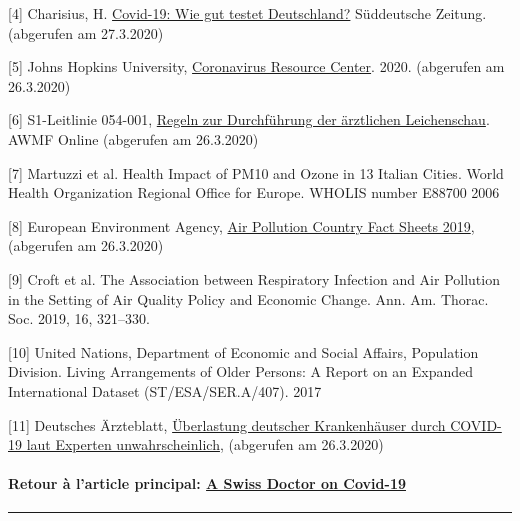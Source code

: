 {[}4{]} Charisius, H.
\href{https://www.sueddeutsche.de/gesundheit/covid-19-coronavirus-testverfahren-1.4855487}{Covid-19:
Wie gut testet Deutschland?} Süddeutsche Zeitung. (abgerufen am
27.3.2020)

{[}5{]} Johns Hopkins University,
\href{https://coronavirus.jhu.edu/map.html}{Coronavirus Resource
Center}. 2020. (abgerufen am 26.3.2020)

{[}6{]} S1-Leitlinie 054-001,
\href{https://www.awmf.org/uploads/tx_szleitlinien/054-002l_S1_Regeln-zur-Durchfuehrung-der-aerztlichen-Leichenschau_2018-02_01.pdf}{Regeln
zur Durchführung der ärztlichen Leichenschau}. AWMF Online (abgerufen am
26.3.2020)

{[}7{]} Martuzzi et al. Health Impact of PM10 and Ozone in 13 Italian
Cities. World Health Organization Regional Office for Europe. WHOLIS
number E88700 2006

{[}8{]} European Environment Agency,
\href{https://www.eea.europa.eu/themes/air/country-fact-sheets/2019-country-fact-sheets}{Air
Pollution Country Fact Sheets 2019}, (abgerufen am 26.3.2020)

{[}9{]} Croft et al. The Association between Respiratory Infection and
Air Pollution in the Setting of Air Quality Policy and Economic Change.
Ann. Am. Thorac. Soc. 2019, 16, 321--330.

{[}10{]} United Nations, Department of Economic and Social Affairs,
Population Division. Living Arrange­ments of Older Persons: A Report on
an Expanded International Dataset (ST/ESA/SER.A/407). 2017

{[}11{]} Deutsches Ärzteblatt,
\href{https://www.aerzteblatt.de/nachrichten/111029/Ueberlastung-deutscher-Krankenhaeuser-durch-COVID-19-laut-Experten-unwahrscheinlich}{Überlastung
deutscher Krankenhäuser durch COVID-19 laut Experten unwahrscheinlich},
(abgerufen am 26.3.2020)

\hypertarget{retour-uxe0-larticle-principal-a-swiss-doctor-on-covid-19}{%
\paragraph{\texorpdfstring{Retour à l'article principal:
\href{https://swprs.org/coronavirus-un-medecin-suisse-parle/}{A Swiss
Doctor on
Covid-19}}{Retour à l'article principal: A Swiss Doctor on Covid-19}}\label{retour-uxe0-larticle-principal-a-swiss-doctor-on-covid-19}}

\begin{center}\rule{0.5\linewidth}{\linethickness}\end{center}

